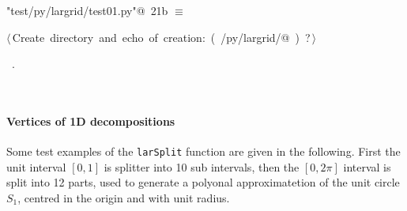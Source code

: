 \documentclass[11pt,oneside]{article}	%
\begin{document}
\begin{flushleft} \small
\begin{minipage}{\linewidth} \label{scrap35}
\protect{}\verb@"test/py/largrid/test01.py"@\nobreak\ {\footnotesize 21b }$\equiv$
\vspace{-1ex}
\begin{list}{}{} \item
\mbox{}\verb@@\hbox{$\langle\,$Create directory and echo of creation:\nobreak\ ({\footnotesize {}\label{scrap36}
 }\mbox{}\verb@test/py/largrid/@ ) {\footnotesize ?}$\,\rangle$}\verb@@\\
\mbox{}\verb@@{\NWsep}
\end{list}
\vspace{-1ex}
\footnotesize\addtolength{\baselineskip}{-1ex}
\begin{list}{}{\setlength{\itemsep}{-\parsep}\setlength{\itemindent}{-\leftmargin}}
\item \NWtxtFileDefBy\ .
\end{list}
\end{minipage}\\[4ex]
\end{flushleft}


\paragraph{Vertices of 1D decompositions}
Some test examples of the \texttt{larSplit} function are given in the following. First the unit interval $[0,1]$ is splitter into 10 sub intervals, then the $[0,2\pi]$ interval is split into 12 parts, used to generate a polyonal approximatetion of the unit circle $S_1$, centred in the origin and with unit radius.
\end{document}
